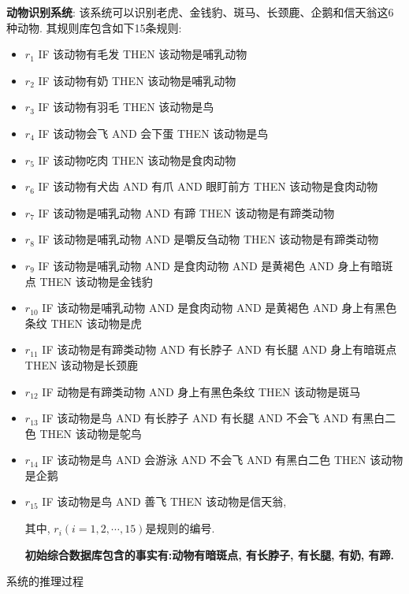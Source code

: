 \begin{example}
    \textbf{动物识别系统}: 该系统可以识别老虎、金钱豹、斑马、长颈鹿、企鹅和信天翁这6种动物. 其规则库包含如下15条规则:
\begin{itemize}
\item $r_{1}$   IF   该动物有毛发   THEN   该动物是哺乳动物
\item $r_{2}$   IF   该动物有奶    THEN   该动物是哺乳动物
\item $r_{3}$   IF   该动物有羽毛  THEN   该动物是鸟
\item $r_{4}$   IF   该动物会飞  AND  会下蛋  THEN  该动物是鸟
\item $r_{5}$   IF   该动物吃肉   THEN   该动物是食肉动物
\item $r_{6}$   IF   该动物有犬齿  AND  有爪   AND   眼盯前方
                          THEN   该动物是食肉动物
\item $r_{7}$   IF  该动物是哺乳动物  AND  有蹄  THEN  该动物是有蹄类动物
\item $r_{8}$   IF 该动物是哺乳动物 AND 是嚼反刍动物 THEN 该动物是有蹄类动物
\item $r_{9}$   IF 该动物是哺乳动物  AND  是食肉动物 AND  是黄褐色
          AND  身上有暗斑点  THEN   该动物是金钱豹

\item $r_{10}$  IF  该动物是哺乳动物   AND  是食肉动物   AND  是黄褐色
          AND  身上有黑色条纹  THEN   该动物是虎
\item $r_{11}$  IF   该动物是有蹄类动物   AND  有长脖子  AND  有长腿
          AND  身上有暗斑点  THEN   该动物是长颈鹿
\item $r_{12}$  IF  动物是有蹄类动物 AND 身上有黑色条纹 THEN 该动物是斑马
\item $r_{13}$  IF   该动物是鸟  AND  有长脖子  AND  有长腿  AND  不会飞
          AND  有黑白二色    THEN   该动物是鸵鸟
\item $r_{14}$  IF   该动物是鸟  AND  会游泳  AND  不会飞   AND  有黑白二色
                              THEN   该动物是企鹅
\item $r_{15}$  IF   该动物是鸟   AND   善飞   THEN   该动物是信天翁,

其中, $r_i(i=1,2,\cdots,15)$是规则的编号.

\textbf{初始综合数据库包含的事实有:动物有暗斑点, 有长脖子, 有长腿, 有奶, 有蹄.}
\end{itemize}
\end{example}

系统的推理过程

